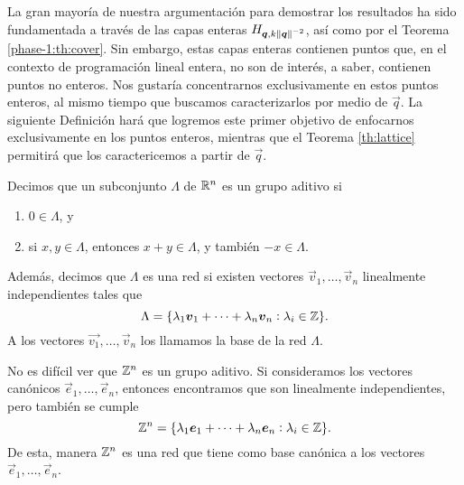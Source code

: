 La gran mayoría de nuestra argumentación para demostrar los resultados ha sido fundamentada a través
de las capas enteras $H_{\boldsymbol{q}, k\left\lVert \boldsymbol{q} \right\rVert^{-2}}$, así como por el Teorema
\ref{phase-1:th:cover}. Sin embargo, estas capas enteras contienen puntos que, en el contexto de
programación lineal entera, no son de interés, a saber, contienen puntos no enteros. Nos gustaría
concentrarnos exclusivamente en estos puntos enteros, al mismo tiempo que buscamos caracterizarlos
por medio de $\vec{q}$. La siguiente Definición hará que logremos este primer objetivo de enfocarnos
exclusivamente en los puntos enteros, mientras que el Teorema \ref{th:lattice} permitirá que los
caractericemos a partir de $\vec{q}$.

\begin{definition}
	Decimos que un subconjunto $\Lambda$ de $\mathbb{R}^n$ es un grupo aditivo si
	\begin{enumerate}
		\item $0 \in \Lambda$, y
		\item si $x, y \in \Lambda$, entonces $x + y \in \Lambda$, y también $-x \in \Lambda$.
	\end{enumerate}
	Además, decimos que $\Lambda$ es una red si existen vectores $\vec{v}_1, \ldots, \vec{v}_n$
	linealmente independientes tales que
	\begin{equation*}
		\Lambda = \lbrace \lambda_1\boldsymbol{v}_1 + \cdots + \lambda_n\boldsymbol{v}_n \vcentcolon \lambda_i \in
		\mathbb{Z} \rbrace.
	\end{equation*}
	A los vectores $\vec{v_1}, \ldots, \vec{v}_n$ los llamamos la base de la red $\Lambda$.
\end{definition}

\begin{example}
	No es difícil ver que $\mathbb{Z}^n$ es un grupo aditivo. Si consideramos los vectores canónicos
	$\vec{e}_1, \ldots, \vec{e}_n$, entonces encontramos que son linealmente independientes, pero
	también se cumple
	\begin{equation*}
		\mathbb{Z}^n = \lbrace \lambda_1\boldsymbol{e}_1 + \cdots + \lambda_n\boldsymbol{e}_n \vcentcolon \lambda_i \in
		\mathbb{Z} \rbrace.
	\end{equation*}
	De esta, manera $\mathbb{Z}^n$ es una red que tiene como base canónica a los vectores $\vec{e}_1,
	\ldots, \vec{e}_n$.
\end{example}

